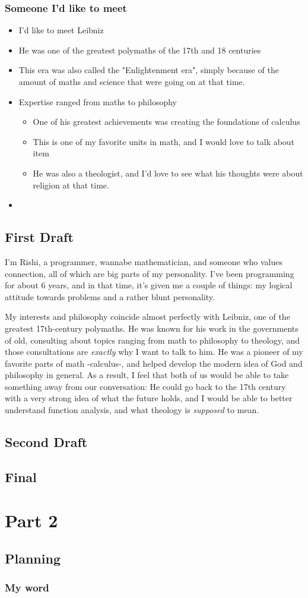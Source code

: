 \documentclass[]{article}
\begin{document}
\subsubsection*{Someone I'd like to meet}
\begin{itemize}
    \item I'd like to meet Leibniz
    \item He was one of the greatest polymaths of the 17th and 18 centuries
    \item This era was also called the "Enlightenment era", simply because of the amount of maths and science that were going on at that time.
    \item Expertise ranged from maths to philosophy
    \begin{itemize}
        \item One of his greatest achievements was creating the foundations of calculus
        \item This is one of my favorite units in math, and I would love to talk about item
        \item He was also a theologist, and I'd love to see what his thoughts were about religion at that time.
    \end{itemize}
    \item 
\end{itemize}

\subsection*{First Draft}
I'm Rishi, a programmer, wannabe mathematician, and someone who values connection, all of which are big parts of my personality. I've been programming for about 6 years, and in that time, it's given me a couple of things: my logical attitude towards problems and a rather blunt personality. 

My interests and philosophy coincide almost perfectly with Leibniz, one of the greatest 17th-century polymaths. He was known for his work in the governments of old, consulting about topics ranging from math to philosophy to theology, and those consultations are \textit{exactly} why I want to talk to him. 
He was a pioneer of my favorite parts of math -calculus-, and helped develop the modern idea of God and philosophy in general. As a result, I feel that both of us would be able to take something away from our conversation: He could go back to the 17th century with a very strong idea of what the future holds, and I would be able to better understand function analysis, and what theology is \textit{supposed} to mean. 

\subsection*{Second Draft}
\newpage
\subsection*{Final}

\section*{Part 2}
\subsection*{Planning}
\subsubsection*{My word}
\textbf{}
\end{document}
